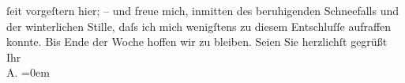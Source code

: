 \begin{ledgroupsized}[t]{13cm}
               ſeit vorgeſtern hier; – und freue mich, inmitten des beruhigenden Schneefalls und der
               winterlichen Stille, daſs ich mich wenigſtens zu diesem Entschluſſe aufraffen konnte.
               Bis Ende der Woche hoffen wir zu bleiben.\pend
           \pstart
           Seien Sie herzlichſt gegrüßt\pend
           \pstart
           Ihr{\\[\baselineskip]}\spacefill\mbox{A.}\pend
           \leftskip=0em{}\endnumbering{}\end{ledgroupsized}  \newcommand{\dateiname}{L01265}\newcommand{\titel}{Arthur Schnitzler an Richard Beer-Hofmann, 14. 1. 1903}\newcommand{\editorInnen}{Martin Anton Müller und Gerd-Hermann Susen}
      